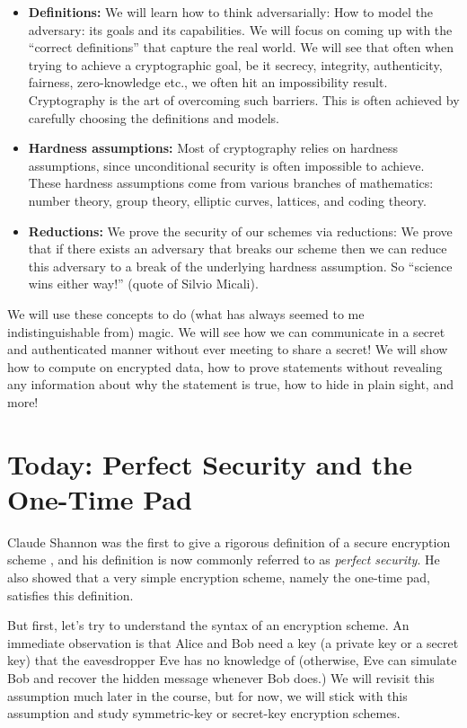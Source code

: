 \begin{itemize}
    \item {\bf Definitions:}  We will learn how to think adversarially: How to model the adversary: its goals and its capabilities. We will focus on coming up with the ``correct definitions'' that capture the real world. We will see that often when trying to achieve a cryptographic goal, be it secrecy, integrity, authenticity, fairness, zero-knowledge etc., we often hit an impossibility result.  Cryptography is the art of overcoming such barriers.  This is often achieved by carefully choosing the definitions and models.  
    \item {\bf Hardness assumptions:} Most of cryptography relies on hardness assumptions, since unconditional security is often impossible to achieve. These hardness assumptions come from various branches of mathematics: number theory, group theory, elliptic curves, lattices, and coding theory.
\item{\bf Reductions:}  We prove the security of our schemes via reductions:  We prove that if there exists an adversary that breaks our scheme then we can reduce this adversary to a break of the underlying hardness assumption.  So ``science wins either way!'' (quote of Silvio Micali).


\end{itemize}

We will use these concepts to do (what has always seemed to me indistinguishable from) magic.  We will see how we can communicate in a secret and authenticated manner without ever meeting to share a secret!  We will show how to compute on encrypted data, how to prove statements without revealing any information about why the statement is true, how to hide in plain sight, and more!


\section{Today: Perfect Security and the One-Time Pad}


Claude Shannon was the first to give a rigorous definition of a secure encryption scheme \cite{shannon1949communication}, and his definition is now commonly referred to as {\em perfect security}. He also showed that a very simple encryption scheme, namely the one-time pad, satisfies this definition. 

But first, let's try to understand the syntax of an encryption scheme. An immediate observation is that Alice and Bob need a key (a private key or a secret key) that the eavesdropper Eve has no knowledge of (otherwise, Eve can simulate Bob and recover the hidden message whenever Bob does.) We will revisit this assumption much later in the course, but for now, we will stick with this assumption and study symmetric-key or secret-key encryption schemes.

